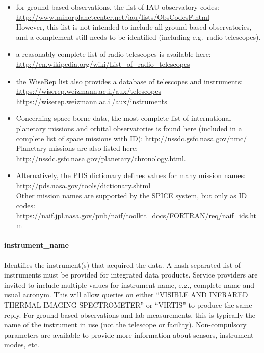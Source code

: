 \documentclass[11pt,a4paper]{ivoa}
\begin{document}
\begin{itemize}
\item for ground-based observations, the list of IAU observatory
codes:\\
\url{http://www.minorplanetcenter.net/iau/lists/ObsCodesF.html}
\\However, this list is not intended to include all ground-based
observatories, and a complement still needs to be identified (including
e.g.\ radio-telescopes).

\item a reasonably complete list of radio-telescopes is available here:\\
\url{http://en.wikipedia.org/wiki/List_of_radio_telescopes}

\item the WiseRep list also
provides a  database of telescopes and instruments:\\
\url{https://wiserep.weizmann.ac.il/aux/telescopes}\\
\url{https://wiserep.weizmann.ac.il/aux/instruments}

\item Concerning space-borne data, the most complete list of
international planetary missions and orbital observatories is
found here (included in a complete list of space missions with ID):
\url{http://nssdc.gsfc.nasa.gov/nmc/}\\
Planetary missions are also listed here:
\url{http://nssdc.gsfc.nasa.gov/planetary/chronology.html}.

\item Alternatively, the PDS dictionary defines values
for many mission names:\\
\url{http://pds.nasa.gov/tools/dictionary.shtml}\\
Other mission names are supported by the SPICE system,
but only as ID codes:\\
\url{https://naif.jpl.nasa.gov/pub/naif/toolkit_docs/FORTRAN/req/naif_ids.html}
\end{itemize}

\paragraph{instrument\_name}

Identifies the instrument(s) that acquired the data.
A hash-separated-list of instruments must be provided
for integrated data products.
Service providers are invited to include multiple values
for instrument name, e.g., complete name and usual acronym.
This will allow queries on either
``VISIBLE AND INFRARED THERMAL IMAGING SPECTROMETER'' or ``VIRTIS''
to produce the same reply. For ground-based observations and lab
measurements, this is typically the name of the instrument in use (not
the telescope or facility). Non-compulsory parameters are available to
provide more information about sensors, instrument modes, etc.
\end{document}
